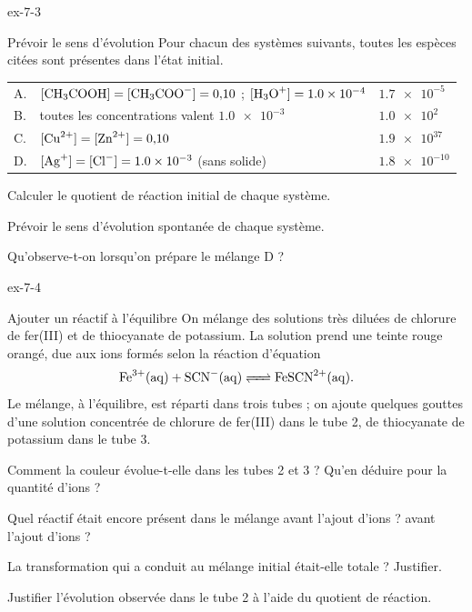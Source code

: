 \begin{blocLivre}{ex-7-3}
\begin{exercice}[1]{Prévoir le sens d'évolution}
Pour chacun des systèmes suivants, toutes les espèces citées sont présentes dans l'état initial.
\begin{center}\small\renewcommand{\arraystretch}{1.25}
\begin{tabularx}{\linewidth}{@{}lYl@{}}\toprule
{} &  & \\\midrule
A.  & $[\ce{CH3COOH}]=[\ce{CH3COO-}]=0{,}10$ ; $[\ce{H3O+}]=\num{1.0e-4}$ & $\num{1.7e-5}$\\
B.  & toutes les concentrations valent $\num{1.0e-3}$ & $\num{1.0e2}$\\
C.  & $[\ce{Cu^2+}]=[\ce{Zn^2+}]=0{,}10$ & $\num{1.9e37}$\\
D.  & $[\ce{Ag+}]=[\ce{Cl-}]=\num{1.0e-3}$ (sans solide) & $\num{1.8e-10}$\\\bottomrule
\end{tabularx}\end{center}
\begin{questions}
\item Calculer le quotient de réaction initial de chaque système.
\item Prévoir le sens d'évolution spontanée de chaque système.
\item Qu'observe-t-on lorsqu'on prépare le mélange D ?
\end{questions}
\end{exercice}
\end{blocLivre}
\begin{blocLivre}{ex-7-4}
\begin{exercice}[1]{Ajouter un réactif à l'équilibre}
On mélange des solutions très diluées de chlorure de fer(III) et de thiocyanate de potassium. La solution prend une
teinte rouge orangé, due aux ions  formés selon la réaction d'équation
\[\ce{Fe^3+(aq) + SCN^-(aq) <=> FeSCN^2+(aq)}.\]
Le mélange, à l'équilibre, est réparti dans trois tubes ; on ajoute quelques gouttes d'une solution concentrée de
chlorure de fer(III) dans le tube 2, de thiocyanate de potassium dans le tube 3.
\begin{questions}
\item Comment la couleur évolue-t-elle dans les tubes 2 et 3 ? Qu'en déduire pour la quantité d'ions  ?
\item Quel réactif était encore présent dans le mélange avant l'ajout d'ions  ? avant l'ajout d'ions  ?
\item La transformation qui a conduit au mélange initial était-elle totale ? Justifier.
\item Justifier l'évolution observée dans le tube 2 à l'aide du quotient de réaction.
\end{questions}
\end{exercice}
\end{blocLivre}

